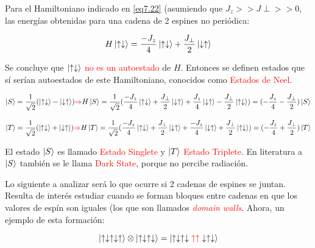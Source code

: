 \documentclass{book}
\begin{document}
Para el Hamiltoniano indicado en \ref{eq7.22} (asumiendo que $J_z >>J\perp>>0$, las energías obtenidas para una cadena de 2 espines no periódica:

\begin{equation}\label{eq7.23} H\ket{\uparrow\downarrow}=\frac{-J_z}{4}\ket{\uparrow\downarrow}+\frac{J_\perp}{2}\ket{\downarrow\uparrow}\end{equation}

Se concluye que $\ket{\uparrow\downarrow}$ \textcolor{red}{no es un autoestado} de $H$. Entonces se definen estados que sí serían autoestados de este Hamiltoniano, conocidos como \textcolor{red}{Estados de Neel}.

\begin{equation}\label{eq7.24}\ket{S}=\frac{1}{\sqrt{2}}(\ket{\uparrow\downarrow}-\ket{\downarrow\uparrow})\textcolor{red}{\Rightarrow}H\ket{S}=\frac{1}{\sqrt{2}}(\frac{-J_z}{4}\ket{\uparrow\downarrow}+\frac{J_\perp}{2}\ket{\downarrow\uparrow}+\frac{J_z}{4}\ket{\downarrow\uparrow}-\frac{J_\perp}{2}\ket{\uparrow\downarrow})=(-\frac{J_z}{4}-\frac{J_\perp}{2})\ket{S}\end{equation}

\begin{equation}\label{eq7.25}\ket{T}=\frac{1}{\sqrt{2}}(\ket{\uparrow\downarrow}+\ket{\downarrow\uparrow})\textcolor{red}{\Rightarrow}H\ket{T}=\frac{1}{\sqrt{2}}(\frac{-J_z}{4}\ket{\uparrow\downarrow}+\frac{J_\perp}{2}\ket{\downarrow\uparrow}+\frac{-J_z}{4}\ket{\downarrow\uparrow}+\frac{J_\perp}{2}\ket{\uparrow\downarrow})=(-\frac{J_z}{4}+\frac{J_\perp}{2})\ket{T}\end{equation}

El estado $\ket{S}$ es llamado \textcolor{red}{Estado Singlete} y $\ket{T}$ \textcolor{red}{Estado Triplete}. En literatura a $\ket{S}$ también se le llama \textcolor{red}{Dark State}, porque no percibe radiación.

Lo siguiente a analizar será lo que ocurre si 2 cadenas de espines se juntan. Resulta de interés estudiar cuando se forman bloques entre cadenas en que los valores de espín son iguales (los que son llamados \textcolor{red}{\textit{domain walls}}. Ahora, un ejemplo de esta formación:

\begin{equation}\label{eq7.26}\ket{\uparrow\downarrow\uparrow\downarrow\uparrow}\otimes\ket{\uparrow\downarrow\uparrow\downarrow}=\ket{\uparrow\downarrow\uparrow\downarrow\textcolor{red}{\uparrow\uparrow}\downarrow\uparrow\downarrow}\end{equation}
\end{document}
